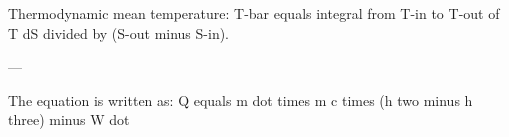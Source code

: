 Thermodynamic mean temperature:  
T-bar equals integral from T-in to T-out of T dS divided by (S-out minus S-in).  

---

The equation is written as:  
Q equals m dot times m c times (h two minus h three) minus W dot
